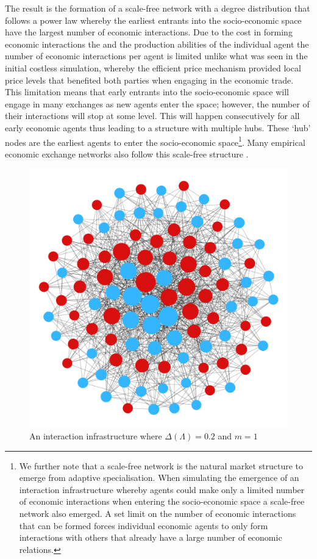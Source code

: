 The result is the formation of a scale-free network with a degree distribution that follows a power law whereby the earliest entrants into the socio-economic space have the largest number of economic interactions. Due to the cost in forming economic interactions the and the production abilities of the individual agent the number of economic interactions per agent is limited unlike what was seen in the initial costless simulation, whereby the efficient price mechanism provided local price levels that benefited both parties when engaging in the economic trade. This limitation means that early entrants into the socio-economic space will engage in many exchanges as new agents enter the space; however, the number of their interactions will stop at some level. This will happen consecutively for all early economic agents thus leading to a structure with multiple hubs. These `hub' nodes are the earliest agents to enter the socio-economic space\footnote{We further note that a scale-free network is the natural market structure to emerge from adaptive specialisation. When simulating the emergence of an interaction infrastructure whereby agents could make only a limited number of economic interactions when entering the socio-economic space a scale-free network also emerged. A set limit on the number of economic interactions that can be formed forces individual economic agents to only form interactions with others that already have a large number of economic relations.}. Many empirical economic exchange networks also follow this scale-free structure \citep{Schweitzer2009}.

\begin{figure}[t]
\centering
\includegraphics[scale=0.22]{Images/Sim3C.png}
\caption{An interaction infrastructure where $\Delta(\Lambda)=0.2$ and $m=1$}
\label{Sim7}
\end{figure}

